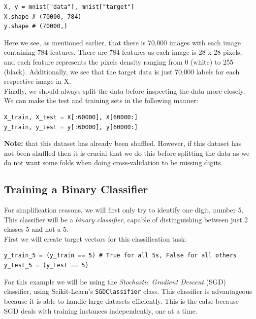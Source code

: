 \begin{verbatim}
X, y = mnist["data"], mnist["target"]
X.shape # (70000, 784)
y.shape # (70000,)    
\end{verbatim}

\noindent 
Here we see, as mentioned earlier, that there is 70,000 images with each image containing 784 
features. There are 784 features as each image is 28 x 28 pixels, and each feature represents the pixels
density ranging from 0 (white) to 255 (black). Additionally, we see that the target data is just 
70,000 labels for each respective image in X. \\ 

\noindent
Finally, we should always split the data before inspecting the data more closely. We can make the 
test and training sets in the following manner:

\begin{verbatim}
X_train, X_test = X[:60000], X[60000:]
y_train, y_test = y[:60000], y[60000:]    
\end{verbatim}

\noindent
\textbf{Note:} that this dataset has already been shuffled. However, if this dataset has not been
shuffled then it is crucial that we do this before splitting the data as we do not want some folds
when doing cross-validation to be missing digits.

\subsection{Training a Binary Classifier}

For simplification reasons, we will first only try to identify one digit, number 5. This classifier 
will be a \textit{binary classifier}, capable of distinguishing between just 2 classes 5 and not a 5.\\

\noindent
First we will create target vectors for this classification task:

\begin{verbatim}
y_train_5 = (y_train == 5) # True for all 5s, False for all others
y_test_5 = (y_test == 5)
\end{verbatim}

For this example we will be using the \textit{Stochastic Gradient Descent} (SGD) classifier, using 
Scikit-Learn's \texttt{SGDClassifier} class. This classifier is advantageous because it 
is able to handle large datasets efficiently. This is the calse because SGD deals with training instances
independently, one at a time.\\


